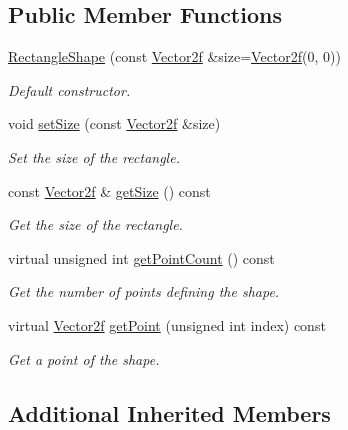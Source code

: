 \subsection*{Public Member Functions}
\begin{DoxyCompactItemize}
\item 
\hyperlink{classsf_1_1RectangleShape_a83a2be157ebee85c95ed491c3e78dd7c}{Rectangle\-Shape} (const \hyperlink{classsf_1_1Vector2}{Vector2f} \&size=\hyperlink{classsf_1_1Vector2}{Vector2f}(0, 0))
\begin{DoxyCompactList}\small\item\em Default constructor. \end{DoxyCompactList}\item 
void \hyperlink{classsf_1_1RectangleShape_a5c65d374d4a259dfdc24efdd24a5dbec}{set\-Size} (const \hyperlink{classsf_1_1Vector2}{Vector2f} \&size)
\begin{DoxyCompactList}\small\item\em Set the size of the rectangle. \end{DoxyCompactList}\item 
const \hyperlink{classsf_1_1Vector2}{Vector2f} \& \hyperlink{classsf_1_1RectangleShape_acaacbaee87c38a526a9d895742faab54}{get\-Size} () const 
\begin{DoxyCompactList}\small\item\em Get the size of the rectangle. \end{DoxyCompactList}\item 
virtual unsigned int \hyperlink{classsf_1_1RectangleShape_a439f5a92583baf972878c836b73bf955}{get\-Point\-Count} () const 
\begin{DoxyCompactList}\small\item\em Get the number of points defining the shape. \end{DoxyCompactList}\item 
virtual \hyperlink{classsf_1_1Vector2}{Vector2f} \hyperlink{classsf_1_1RectangleShape_a3994f7f937d6332fe64b6990d5bc43a1}{get\-Point} (unsigned int index) const 
\begin{DoxyCompactList}\small\item\em Get a point of the shape. \end{DoxyCompactList}\end{DoxyCompactItemize}
\subsection*{Additional Inherited Members}


